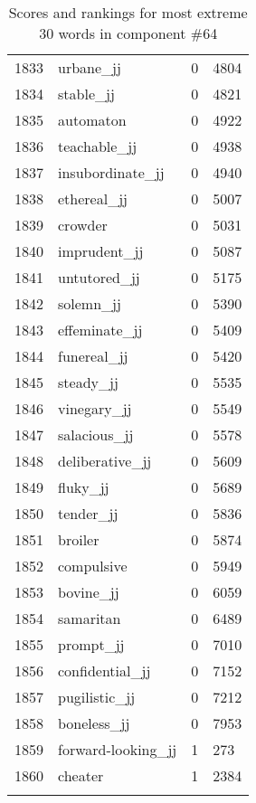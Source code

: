 \begin{longtable}[!htbp]{| rlr@{.}l |}
    1833 & urbane\_jj & 0 & 4804 \\
    1834 & stable\_jj & 0 & 4821 \\
    1835 & automaton & 0 & 4922 \\
    1836 & teachable\_jj & 0 & 4938 \\
    1837 & insubordinate\_jj & 0 & 4940 \\
    1838 & ethereal\_jj & 0 & 5007 \\
    1839 & crowder & 0 & 5031 \\
    1840 & imprudent\_jj & 0 & 5087 \\
    1841 & untutored\_jj & 0 & 5175 \\
    1842 & solemn\_jj & 0 & 5390 \\
    1843 & effeminate\_jj & 0 & 5409 \\
    1844 & funereal\_jj & 0 & 5420 \\
    1845 & steady\_jj & 0 & 5535 \\
    1846 & vinegary\_jj & 0 & 5549 \\
    1847 & salacious\_jj & 0 & 5578 \\
    1848 & deliberative\_jj & 0 & 5609 \\
    1849 & fluky\_jj & 0 & 5689 \\
    1850 & tender\_jj & 0 & 5836 \\
    1851 & broiler & 0 & 5874 \\
    1852 & compulsive & 0 & 5949 \\
    1853 & bovine\_jj & 0 & 6059 \\
    1854 & samaritan & 0 & 6489 \\
    1855 & prompt\_jj & 0 & 7010 \\
    1856 & confidential\_jj & 0 & 7152 \\
    1857 & pugilistic\_jj & 0 & 7212 \\
    1858 & boneless\_jj & 0 & 7953 \\
    1859 & forward-looking\_jj & 1 & 273 \\
    1860 & cheater & 1 & 2384 \\
    \hline
    \caption{Scores and rankings for most extreme 30 words in component \#64} \\
\end{longtable}

